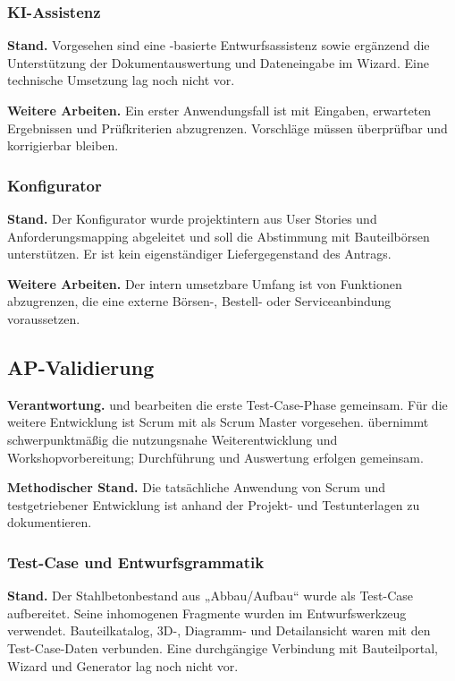 \documentclass[type=zwischenbericht]{zukunftbau}
\begin{document}
\subsubsection{KI-Assistenz}

\textbf{Stand.} Vorgesehen sind eine -basierte Entwurfsassistenz sowie ergänzend die Unterstützung der Dokumentauswertung und Dateneingabe im Wizard. Eine technische Umsetzung lag noch nicht vor.

\textbf{Weitere Arbeiten.} Ein erster Anwendungsfall ist mit Eingaben, erwarteten Ergebnissen und Prüfkriterien abzugrenzen. Vorschläge müssen überprüfbar und korrigierbar bleiben.

\subsubsection{Konfigurator}

\textbf{Stand.} Der Konfigurator wurde projektintern aus User Stories und Anforderungsmapping abgeleitet und soll die Abstimmung mit Bauteilbörsen unterstützen. Er ist kein eigenständiger Liefergegenstand des Antrags.

\textbf{Weitere Arbeiten.} Der intern umsetzbare Umfang ist von Funktionen abzugrenzen, die eine externe Börsen-, Bestell- oder Serviceanbindung voraussetzen.

\subsection{AP-Validierung}

\textbf{Verantwortung.}  und  bearbeiten die erste Test-Case-Phase gemeinsam. Für die weitere Entwicklung ist Scrum mit  als Scrum Master vorgesehen.  übernimmt schwerpunktmäßig die nutzungsnahe Weiterentwicklung und Workshopvorbereitung; Durchführung und Auswertung erfolgen gemeinsam.

\textbf{Methodischer Stand.} Die tatsächliche Anwendung von Scrum und testgetriebener Entwicklung ist anhand der Projekt- und Testunterlagen zu dokumentieren.

\subsubsection{Test-Case und Entwurfsgrammatik}

\textbf{Stand.} Der Stahlbetonbestand aus „Abbau/Aufbau“ wurde als Test-Case aufbereitet. Seine inhomogenen Fragmente wurden im Entwurfswerkzeug verwendet. Bauteilkatalog, 3D-, Diagramm- und Detailansicht waren mit den Test-Case-Daten verbunden. Eine durchgängige Verbindung mit Bauteilportal, Wizard und Generator lag noch nicht vor.
\end{document}
